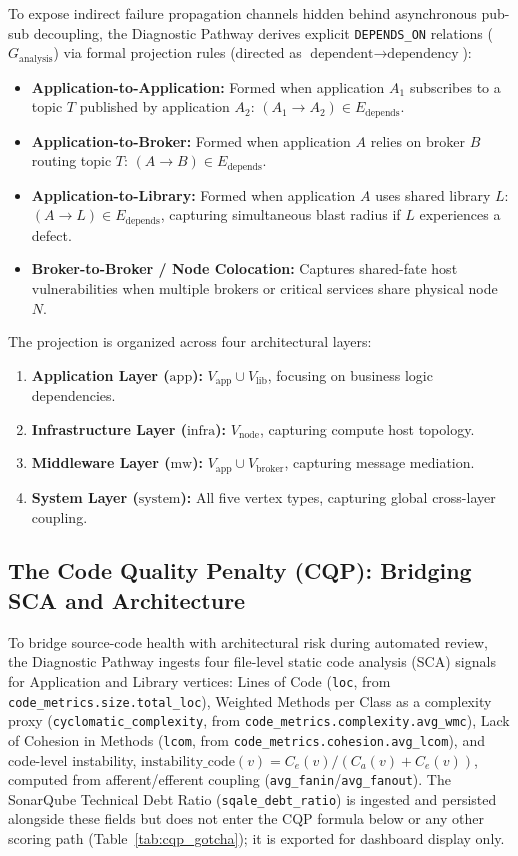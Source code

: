 To expose indirect failure propagation channels hidden behind asynchronous pub-sub decoupling, the Diagnostic Pathway derives explicit \texttt{DEPENDS\_ON} relations ($G_{\text{analysis}}$) via formal projection rules (directed as $\text{dependent} \to \text{dependency}$):
\begin{itemize}
    \item \textbf{Application-to-Application:} Formed when application $A_1$ subscribes to a topic $T$ published by application $A_2$: $(A_1 \to A_2) \in E_{\text{depends}}$.
    \item \textbf{Application-to-Broker:} Formed when application $A$ relies on broker $B$ routing topic $T$: $(A \to B) \in E_{\text{depends}}$.
    \item \textbf{Application-to-Library:} Formed when application $A$ uses shared library $L$: $(A \to L) \in E_{\text{depends}}$, capturing simultaneous blast radius if $L$ experiences a defect.
    \item \textbf{Broker-to-Broker / Node Colocation:} Captures shared-fate host vulnerabilities when multiple brokers or critical services share physical node $N$.
\end{itemize}

The projection is organized across four architectural layers:
\begin{enumerate}
    \item \textbf{Application Layer ($\text{app}$):} $V_{\text{app}} \cup V_{\text{lib}}$, focusing on business logic dependencies.
    \item \textbf{Infrastructure Layer ($\text{infra}$):} $V_{\text{node}}$, capturing compute host topology.
    \item \textbf{Middleware Layer ($\text{mw}$):} $V_{\text{app}} \cup V_{\text{broker}}$, capturing message mediation.
    \item \textbf{System Layer ($\text{system}$):} All five vertex types, capturing global cross-layer coupling.
\end{enumerate}

\subsection{The Code Quality Penalty (CQP): Bridging SCA and Architecture}
\label{sec:model:cqp}

To bridge source-code health with architectural risk during automated review, the Diagnostic Pathway ingests four file-level static code analysis (SCA) signals for Application and Library vertices: Lines of Code (\texttt{loc}, from \texttt{code\_metrics.size.total\_loc}), Weighted Methods per Class as a complexity proxy (\texttt{cyclomatic\_complexity}, from \texttt{code\_metrics.complexity.avg\_wmc}), Lack of Cohesion in Methods (\texttt{lcom}, from \texttt{code\_metrics.cohesion.avg\_lcom}), and code-level instability, $\text{instability\_code}(v) = C_e(v) / (C_a(v) + C_e(v))$, computed from afferent/efferent coupling (\texttt{avg\_fanin}/\texttt{avg\_fanout}). The SonarQube Technical Debt Ratio (\texttt{sqale\_debt\_ratio}) is ingested and persisted alongside these fields but does not enter the CQP formula below or any other scoring path (Table~\ref{tab:cqp_gotcha}); it is exported for dashboard display only.

